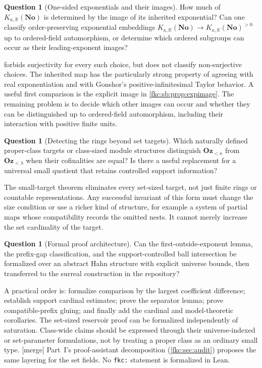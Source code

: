 \documentclass[11pt,letterpaper]{article}
\numberwithin{equation}{section}
\theoremstyle{definition}
\newtheorem{question}[theorem]{Question}
\theoremstyle{remark}
\newcommand{\R}{\mathbb R}
\newcommand{\No}{\mathbf{No}}
\newcommand{\mergetag}{\textup{\textsf{\small[merge]}}}%
\newcommand{\Oz}{\mathbf{Oz}}
\newcommand{\KN}[2]{K_{#1,#2}(\No)}%
\newcommand{\Ok}{\Oz_{<\kappa}}
\newcommand{\Okl}[1]{\Oz_{<#1}}
\newcommand{\lbl}[1]{\nolinkurl{#1}}%
\begin{document}
\begin{question}[One-sided exponentials and their images]\label{fkc:sb:q:onesided}
How much of $\KN\kappa\R$ is determined by the image of its inherited exponential? Can one classify order-preserving exponential embeddings $\KN\kappa\R\to\KN\kappa\R^{>0}$ up to ordered-field automorphism, or determine which ordered subgroups can occur as their leading-exponent images?
\end{question}
 forbids surjectivity for every such choice, but does not classify non-surjective choices. The inherited map has the particularly strong property of agreeing with real exponentiation and with Gonshor's positive-infinitesimal Taylor behavior. A useful first comparison is the explicit image in \cref{fkc:sb:prop:expimage}. The remaining problem is to decide which other images can occur and whether they can be distinguished up to ordered-field automorphism, including their interaction with positive finite units.

\begin{question}[Detecting the rings beyond set targets]\label{fkc:sb:q:beyondset}
Which naturally defined proper-class targets or class-sized module structures distinguish $\Ok$ from $\Okl\lambda$ when their cofinalities are equal? Is there a useful replacement for a universal small quotient that retains controlled support information?
\end{question}
The small-target theorem eliminates every set-sized target, not just finite rings or countable representations. Any successful invariant of this form must change the size condition or use a richer kind of structure, for example a system of partial maps whose compatibility records the omitted nests. It cannot merely increase the set cardinality of the target.

\begin{question}[Formal proof architecture]\label{fkc:sb:q:formal}
Can the first-outside-exponent lemma, the prefix-gap classification, and the support-controlled ball intersection be formalized over an abstract Hahn structure with explicit universe bounds, then transferred to the surreal construction in the repository?
\end{question}
A practical order is: formalize comparison by the largest coefficient difference; establish support cardinal estimates; prove the separator lemma; prove compatible-prefix gluing; and finally add the cardinal and model-theoretic corollaries. The set-sized reservoir proof can be formalized independently of saturation. Class-wide claims should be expressed through their universe-indexed or set-parameter formulations, not by treating a proper class as an ordinary small type. \mergetag{} Part~I's proof-assistant decomposition (\cref{fkc:sec:audit}) proposes the same layering for the set fields. No \lbl{fkc:} statement is formalized in Lean.
\end{document}
